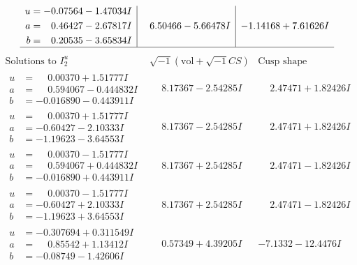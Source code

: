 \documentclass[1p]{elsarticle_modified}
\theoremstyle{definition}
\newcommand{\I}{\sqrt{-1}}
\begin{document}
$$\begin{array}{c|c|c}
\begin{aligned}
u &= -0.07564 - 1.47034 I \\
a &= \phantom{-}0.46427 - 2.67817 I \\
b &= \phantom{-}0.20535 - 3.65834 I\end{aligned}
 & \phantom{-}6.50466 - 5.66478 I & -1.14168 + 7.61626 I\\
 \hline 
 \end{array}$$\newpage$$\begin{array}{c|c|c}  
\text{Solutions to }I^u_{2}& \I (\text{vol} + \sqrt{-1}CS) & \text{Cusp shape}\\
 \hline 
\begin{aligned}
u &= \phantom{-}0.00370 + 1.51777 I \\
a &= \phantom{-}0.594067 - 0.444832 I \\
b &= -0.016890 - 0.443911 I\end{aligned}
 & \phantom{-}8.17367 - 2.54285 I & \phantom{-}2.47471 + 1.82426 I \\ \hline\begin{aligned}
u &= \phantom{-}0.00370 + 1.51777 I \\
a &= -0.60427 - 2.10333 I \\
b &= -1.19623 - 3.64553 I\end{aligned}
 & \phantom{-}8.17367 - 2.54285 I & \phantom{-}2.47471 + 1.82426 I \\ \hline\begin{aligned}
u &= \phantom{-}0.00370 - 1.51777 I \\
a &= \phantom{-}0.594067 + 0.444832 I \\
b &= -0.016890 + 0.443911 I\end{aligned}
 & \phantom{-}8.17367 + 2.54285 I & \phantom{-}2.47471 - 1.82426 I \\ \hline\begin{aligned}
u &= \phantom{-}0.00370 - 1.51777 I \\
a &= -0.60427 + 2.10333 I \\
b &= -1.19623 + 3.64553 I\end{aligned}
 & \phantom{-}8.17367 + 2.54285 I & \phantom{-}2.47471 - 1.82426 I \\ \hline\begin{aligned}
u &= -0.307694 + 0.311549 I \\
a &= \phantom{-}0.85542 + 1.13412 I \\
b &= -0.08749 - 1.42606 I\end{aligned}
 & \phantom{-}0.57349 + 4.39205 I & -7.1332 - 12.4476 I \\ \hline\begin{aligned}

\end{aligned}
\end{array}$$
\end{document}
